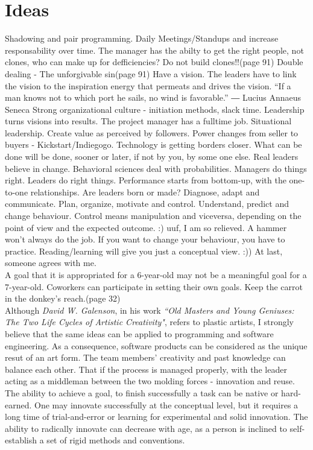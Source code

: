 \documentclass[conference]{IEEEtran}
\begin{document}
\section{Ideas}
Shadowing and pair programming. Daily Meetings/Standups and increase responsability over time. 
The manager has the abilty to get the right people, not clones, who can make up for defficiencies? Do not build clones!!(page 91)
Double dealing - The unforgivable sin(page 91)
Have a vision. The leaders have to link the vision to the inspiration energy that permeats and drives the vision. 
“If a man knows not to which port he sails, no wind is favorable.” 
― Lucius Annaeus Seneca
Strong organizational culture - initiation methods, slack time.
Leadership turns visions into results.
The project manager has a fulltime job.
Situational leadership.
Create value as perceived by followers.
Power changes from seller to buyers - Kickstart/Indiegogo.
Technology is getting borders closer.
What can be done will be done, sooner or later, if not by you, by some one else.
Real leaders believe in change.
Behavioral sciences deal with probabilities.
Managers do things right. Leaders do right things.
Performance starts from bottom-up, with the one-to-one relationships.
Are leaders born or made?
Diagnose, adapt and communicate.
Plan, organize, motivate and control.
Understand, predict and change behaviour. Control means manipulation and viceversa, depending on the point of view and the expected outcome. :) uuf, I am so relieved.
A hammer won't always do the job.
If you want to change your behaviour, you have to practice. Reading/learning will give you just a conceptual view. :)) At last, someone agrees with me.\cite{IEEEhowto:fulltime}\\
A goal that it is appropriated for a 6-year-old may not be a meaningful goal for a 7-year-old. Coworkers can participate in setting their own goals.
Keep the carrot in the donkey's reach.(page 32)
\\
\indent
Although \emph{David W. Galenson}, in his work \emph{``Old Masters and Young Geniuses: The Two Life Cycles of Artistic Creativity"}, refers to plastic artists, I strongly believe that the same ideas can be applied to programming and software engineering. As a consequence, software products can be considered as the unique resut of an art form. The team members' creativity and past knowledge can balance each other. That if the process is managed properly, with the leader acting as a middleman between the two molding forces - innovation and reuse. The ability to achieve a goal, to finish successfully a task can be native or hard-earned. One may innovate successfully at the conceptual level, but it requires a long time of trial-and-error or learning for experimental and solid innovation. The ability to radically innovate can decrease with age, as a person is inclined to self-establish a set of rigid methods and conventions.\cite{IEEEhowto:oldvsyoung}
\end{document}
